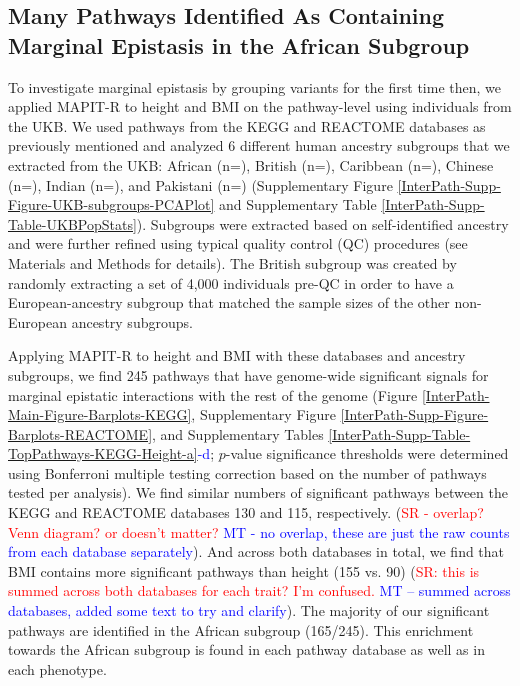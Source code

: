 \documentclass[12pt,a4paper]{article}
\newcommand{\red}[1]{\textcolor{red}{#1}}
\begin{document}
\subsection{Many Pathways Identified As Containing Marginal Epistasis in the African Subgroup}\label{InterPath-Results-PathwayEpistasis}

To investigate marginal epistasis by grouping variants for the first time then, we applied MAPIT-R to height and BMI on the pathway-level using individuals from the UKB. We used pathways from the KEGG and REACTOME databases \citep{Liberzon2011} as previously mentioned and analyzed 6 different human ancestry subgroups that we extracted from the UKB: African (n=), British (n=), Caribbean (n=), Chinese (n=), Indian (n=), and Pakistani (n=) (Supplementary Figure \ref{InterPath-Supp-Figure-UKB-subgroups-PCAPlot} and Supplementary Table \ref{InterPath-Supp-Table-UKBPopStats}). Subgroups were extracted based on self-identified ancestry and were further refined using typical quality control (QC) procedures (see Materials and Methods for details). The British subgroup was created by randomly extracting a set of 4,000 individuals pre-QC in order to have a European-ancestry subgroup that matched the sample sizes of the other non-European ancestry subgroups. 

Applying MAPIT-R to height and BMI with these databases and ancestry subgroups, we find 245 pathways that have genome-wide significant signals for marginal epistatic interactions with the rest of the genome (Figure \ref{InterPath-Main-Figure-Barplots-KEGG}, Supplementary Figure \ref{InterPath-Supp-Figure-Barplots-REACTOME}, and Supplementary Tables \ref{InterPath-Supp-Table-TopPathways-KEGG-Height-a}\textcolor{blue}{-d}; $p$-value significance thresholds were determined using Bonferroni multiple testing correction based on the number of pathways tested per analysis). We find similar numbers of significant pathways between the KEGG and REACTOME databases 130 and 115, respectively. (\red{SR - overlap? Venn diagram? or doesn't matter?} \textcolor{blue}{MT - no overlap, these are just the raw counts from each database separately}). And across both databases in total, we find that BMI contains more significant pathways than height (155 vs. 90) (\red{SR: this is summed across both databases for each trait? I'm confused.} \textcolor{blue}{MT -- summed across databases, added some text to try and clarify}). The majority of our significant pathways are identified in the African subgroup (165/245). This enrichment towards the African subgroup is found in each pathway database as well as in each phenotype.
\end{document}
